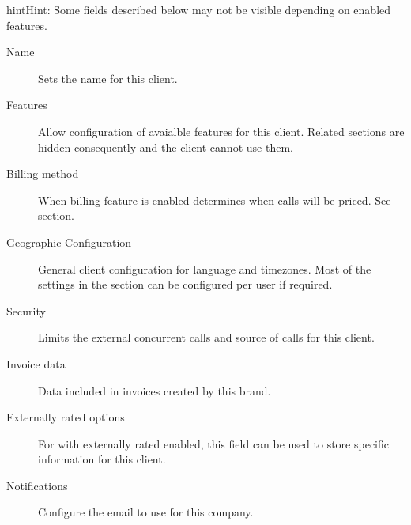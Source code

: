 \documentclass[letterpaper,10pt,english]{sphinxmanual}
\begin{document}
\begin{notice}{hint}{Hint:}
Some fields described below may not be visible depending on enabled features.
\end{notice}
\begin{description}
\item[{Name}] \leavevmode{}\label{brand/retail:term-name}
Sets the name for this client.

\item[{Features}] \leavevmode{}\label{brand/retail:term-features}
Allow configuration of avaialble features for this client.
Related sections are hidden consequently and the client cannot use them.

\item[{Billing method}] \leavevmode{}\label{brand/retail:term-billing-method}
When billing feature is enabled determines when calls will be priced. See {\hyperref[brand/billing/index:billing]{}} section.

\item[{Geographic Configuration}] \leavevmode{}\label{brand/retail:term-geographic-configuration}
General client configuration for language and timezones. Most of the settings in the section can be
configured per user if required.

\item[{Security}] \leavevmode{}\label{brand/retail:term-security}
Limits the external concurrent calls and source of calls for this client.

\item[{Invoice data}] \leavevmode{}\label{brand/retail:term-invoice-data}
Data included in invoices created by this brand.

\item[{Externally rated options}] \leavevmode{}\label{brand/retail:term-externally-rated-options}
For {\hyperref[brand/peering/peering_contracts:peering\string-contracts]{}} with externally rated enabled, this field can be used to store specific
information for this client.

\item[{Notifications}] \leavevmode{}\label{brand/retail:term-notifications}
Configure the email {\hyperref[brand/notifications:notification\string-templates]{}} to use for this company.


\end{description}
\end{document}
